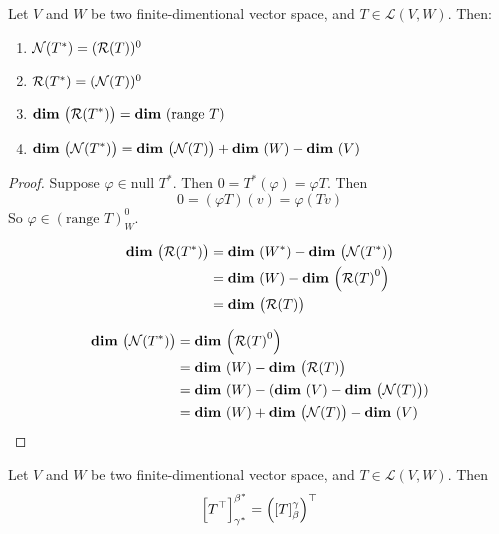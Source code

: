 \begin{theorem}
    Let $V$ and $W$ be two finite-dimentional vector space, and $T \in \mathcal{L}(V,W)$. Then:
    \begin{enumerate}
        \item $\nullspace{T^*}  = (\rangespace{T} )^0$
        \item $\rangespace{T^*} = (\nullspace{T} )^0$
        \item $\dimension{\rangespace{T^*}} = \dimension{\text{range } T}$
        \item $\dimension{\nullspace{T^*}} = \dimension{\nullspace{T}} + \dimension{W} - \dimension{V}$
    \end{enumerate}
\end{theorem}

\begin{proof}
    Suppose $\varphi \in \text{null } T^*$. Then $ 0 = T^*(\varphi) = \varphi T$. Then
    \begin{equation*}
        0 = (\varphi T)(v) = \varphi (Tv) 
    \end{equation*}
    So $\varphi \in (\text{range } T)^0_W$.
    
    \begin{equation*}
        \begin{aligned}
            \dimension{\rangespace{T^*}} &= \dimension{W^*} - \dimension{\nullspace{T^*}} \\
            &= \dimension{W} - \dimension{\rangespace{T}^0} \\
            &= \dimension{\rangespace{T}}
        \end{aligned}
    \end{equation*}
    
    \begin{equation*}
        \begin{aligned}
            \dimension{\nullspace{T^*}} &= \dimension{\rangespace{T}^0}\\
            &= \dimension{W} - \dimension{\rangespace{T}} \\
            &= \dimension{W} - (\dimension{V} - \dimension{\nullspace{T}} ) \\
            &= \dimension{W} + \dimension{\nullspace{T}} - \dimension{V}
        \end{aligned}
    \end{equation*}
\end{proof}

\begin{theorem}
    Let $V$ and $W$ be two finite-dimentional vector space, and $T \in \mathcal{L}(V,W)$. Then
    \begin{equation}
	    \mleft[T^\top \mright]_{\gamma^*}^{\beta^*} = \mleft(\mleft[T \mright]_\beta^\gamma \mright)^\top
	\end{equation}
\end{theorem}




